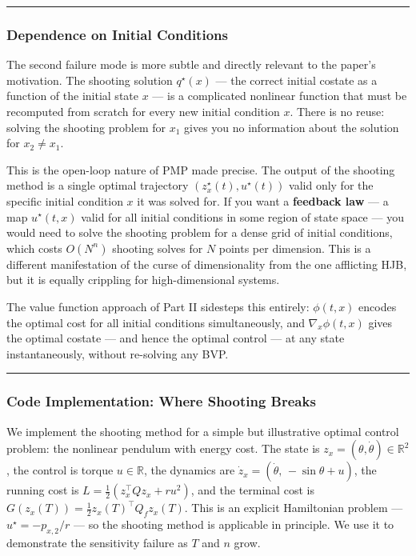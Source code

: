 \documentclass{article}
\begin{document}
\medskip\hrule\medskip

\subsubsection{Dependence on Initial Conditions}

\begin{tldrbox}
The second failure mode is more subtle and directly relevant to the paper's motivation. The shooting solution $q^\star(x)$ — the correct initial costate as a function of the initial state $x$ — is a complicated nonlinear function that must be recomputed from scratch for every new initial condition $x$. There is no reuse: solving the shooting problem for $x_1$ gives you no information about the solution for $x_2 \neq x_1$.

This is the open-loop nature of PMP made precise. The output of the shooting method is a single optimal trajectory $(z_x^\star(t), u^\star(t))$ valid only for the specific initial condition $x$ it was solved for. If you want a \textbf{feedback law} — a map $u^\star(t, x)$ valid for all initial conditions in some region of state space — you would need to solve the shooting problem for a dense grid of initial conditions, which costs $O(N^n)$ shooting solves for $N$ points per dimension. This is a different manifestation of the curse of dimensionality from the one afflicting HJB, but it is equally crippling for high-dimensional systems.

The value function approach of Part II sidesteps this entirely: $\phi(t, x)$ encodes the optimal cost for all initial conditions simultaneously, and $\nabla_x \phi(t, x)$ gives the optimal costate — and hence the optimal control — at any state instantaneously, without re-solving any BVP.
\end{tldrbox}

\medskip\hrule\medskip

\subsubsection{Code Implementation: Where Shooting Breaks}

We implement the shooting method for a simple but illustrative optimal control problem: the nonlinear pendulum with energy cost. The state is $z_x = (\theta, \dot{\theta}) \in \mathbb{R}^2$, the control is torque $u \in \mathbb{R}$, the dynamics are $\dot{z}_x = (\dot{\theta},\, -\sin\theta + u)$, the running cost is $L = \frac{1}{2}(z_x^\top Q z_x + r u^2)$, and the terminal cost is $G(z_x(T)) = \frac{1}{2} z_x(T)^\top Q_f z_x(T)$. This is an explicit Hamiltonian problem — $u^\star = -p_{x,2}/r$ — so the shooting method is applicable in principle. We use it to demonstrate the sensitivity failure as $T$ and $n$ grow.
\end{document}
